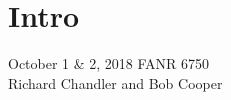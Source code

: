 \documentclass[color=usenames,dvipsnames]{beamer}\usepackage[]{graphicx}\usepackage[]{color}
\makeatletter
\newcommand{\hlnum}[1]{\textcolor[rgb]{0.69,0.494,0}{#1}}%
\newcommand{\hlstr}[1]{\textcolor[rgb]{0.749,0.012,0.012}{#1}}%
\newcommand{\hlcom}[1]{\textcolor[rgb]{0.514,0.506,0.514}{\textit{#1}}}%
\newcommand{\hlopt}[1]{\textcolor[rgb]{0,0,0}{#1}}%
\newcommand{\hlstd}[1]{\textcolor[rgb]{0,0,0}{#1}}%
\newcommand{\hlkwb}[1]{\textcolor[rgb]{0,0.341,0.682}{#1}}%
\newcommand{\hlkwc}[1]{\textcolor[rgb]{0,0,0}{\textbf{#1}}}%
\newcommand{\hlkwd}[1]{\textcolor[rgb]{0.004,0.004,0.506}{#1}}%
\newenvironment{kframe}{%
 \def\at@end@of@kframe{}%
 \ifinner\ifhmode%
  \def\at@end@of@kframe{\end{minipage}}%
  \begin{minipage}{\columnwidth}%
 \fi\fi%
 \def\FrameCommand##1{\hskip\@totalleftmargin \hskip-\fboxsep
 \colorbox{shadecolor}{##1}\hskip-\fboxsep
     \hskip-\linewidth \hskip-\@totalleftmargin \hskip\columnwidth}%
 \MakeFramed {\advance\hsize-\width
   \@totalleftmargin\z@ \linewidth\hsize
   \@setminipage}}%
 {\par\unskip\endMakeFramed%
 \at@end@of@kframe}
\newenvironment{knitrout}{}{} %
\makeatother
\begin{document}
\section{Intro}

\begin{frame}[plain]
  \LARGE
  \centering \par
  {\color{RoyalBlue}{Lab 7 -- $A \times B$ Factorial Designs}} \par
  \vspace{1cm}
  \Large
  October 1 \& 2, 2018
  FANR 6750 \\
  \vfill
  \large
  Richard Chandler and Bob Cooper
\end{frame}



\begin{comment}
\begin{frame}[fragile]
  \frametitle{Data}
\begin{knitrout}
\definecolor{shadecolor}{rgb}{0.878, 0.918, 0.933}\color{fgcolor}\begin{kframe}
\begin{alltt}
\hlstd{makeData} \hlkwb{<-} \hlkwd{data.frame}\hlstd{(}\hlkwc{precip}\hlstd{=}\hlkwd{rep}\hlstd{(}\hlkwd{c}\hlstd{(}\hlstr{"Wet"}\hlstd{,} \hlstr{"Dry"}\hlstd{),} \hlkwc{each}\hlstd{=}\hlnum{24}\hlstd{),}
                       \hlkwc{temp}\hlstd{=}\hlkwd{rep}\hlstd{(}\hlkwd{c}\hlstd{(}\hlstr{"Cold"}\hlstd{,} \hlstr{"Hot"}\hlstd{),} \hlkwc{times}\hlstd{=}\hlnum{24}\hlstd{))}
\hlstd{X} \hlkwb{<-} \hlkwd{model.matrix}\hlstd{(}\hlopt{~}\hlstd{precip}\hlopt{*}\hlstd{temp, makeData)} \hlcom{#~forest*season, makeData)}
\hlstd{E} \hlkwb{<-} \hlstd{X} \hlopt{%*%} \hlkwd{c}\hlstd{(}\hlnum{20}\hlstd{,} \hlnum{3}\hlstd{,} \hlopt{-}\hlnum{3}\hlstd{,} \hlopt{-}\hlnum{10}\hlstd{)}
\hlkwd{set.seed}\hlstd{(}\hlnum{3440}\hlstd{)}
\hlstd{species} \hlkwb{<-} \hlkwd{round}\hlstd{(}\hlkwd{rnorm}\hlstd{(}\hlkwd{nrow}\hlstd{(X), E,} \hlkwc{sd}\hlstd{=}\hlnum{2}\hlstd{))}
\hlstd{species}
\end{alltt}
\begin{verbatim}
##  [1] 27  9 23 10 21 12 28  8 23 11 20 10 24 12 21 12 26  8 22 10 21 11 25
## [24]  9 17 18 25 15 15 16 21 22 21 17 20 17 19 18 21 17 19 20 21 18 19 15
## [47] 21 17
\end{verbatim}
\begin{alltt}
\hlstd{richness} \hlkwb{<-} \hlkwd{data.frame}\hlstd{(species, makeData)}
\hlkwd{summary}\hlstd{(}\hlkwd{aov}\hlstd{(species} \hlopt{~} \hlstd{precip}\hlopt{*}\hlstd{temp, richness))}
\end{alltt}

\end{comment}
\end{document}
